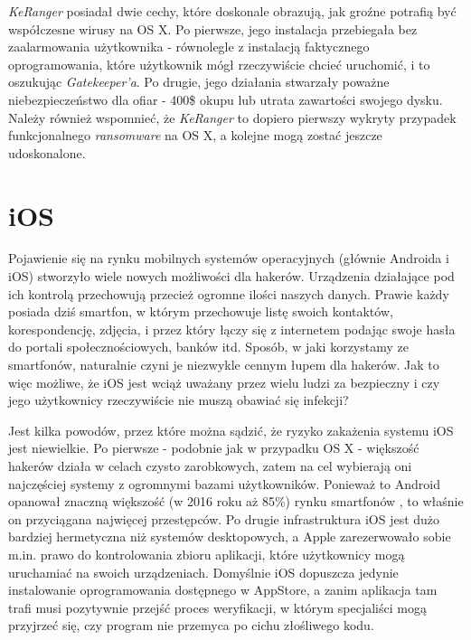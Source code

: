 \documentclass[polish]{kbk}
\begin{document}
\textit{KeRanger} posiadał dwie cechy, które doskonale obrazują, jak groźne potrafią być współczesne wirusy na OS X. Po pierwsze, jego instalacja przebiegała bez zaalarmowania użytkownika - równolegle z instalacją faktycznego oprogramowania, które użytkownik mógł rzeczywiście chcieć uruchomić, i to oszukując \textit{Gatekeeper'a}. Po drugie, jego działania stwarzały poważne niebezpieczeństwo dla ofiar - 400\$ okupu lub utrata zawartości swojego dysku. Należy również wspomnieć, że \textit{KeRanger} to dopiero pierwszy wykryty przypadek funkcjonalnego \textit{ransomware} na OS X, a kolejne mogą zostać jeszcze udoskonalone.

\section{iOS}
Pojawienie się na rynku mobilnych systemów operacyjnych (głównie Androida i iOS) stworzyło wiele nowych możliwości dla hakerów. Urządzenia działające pod ich kontrolą przechowują przecież ogromne ilości naszych danych. Prawie każdy posiada dziś smartfon, w którym przechowuje listę swoich kontaktów, korespondencję, zdjęcia, i przez który łączy się z internetem podając swoje hasła do portali społecznościowych, banków itd. Sposób, w jaki korzystamy ze smartfonów, naturalnie czyni je niezwykle cennym łupem dla hakerów. Jak to więc możliwe, że iOS jest wciąż uważany przez wielu ludzi za bezpieczny i czy jego użytkownicy rzeczywiście nie muszą obawiać się infekcji?

Jest kilka powodów, przez które można sądzić, że ryzyko zakażenia systemu iOS jest niewielkie. Po pierwsze - podobnie jak w przypadku OS X - większość hakerów działa w celach czysto zarobkowych, zatem na cel wybierają oni najczęściej systemy z ogromnymi bazami użytkowników. Ponieważ to Android opanował znaczną większość (w 2016 roku aż 85\%) rynku smartfonów \cite{android}, to właśnie on przyciągana najwięcej przestępców. Po drugie infrastruktura iOS jest dużo bardziej hermetyczna niż systemów desktopowych, a Apple zarezerwowało sobie m.in. prawo do kontrolowania zbioru aplikacji, które użytkownicy mogą uruchamiać na swoich urządzeniach. Domyślnie iOS dopuszcza jedynie instalowanie oprogramowania dostępnego w AppStore, a zanim aplikacja tam trafi musi pozytywnie przejść proces weryfikacji, w którym specjaliści mogą przyjrzeć się, czy program nie przemyca po cichu złośliwego kodu.
\end{document}
